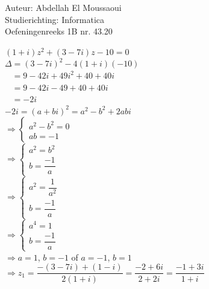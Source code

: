 \documentclass[a4paper]{article}
\begin{document}
  
\noindent \large Auteur: Abdellah El Moussaoui \\
\noindent \large Studierichting: Informatica\\
\noindent \large Oefeningenreeks 1B nr. 43.20\\

\medskip

\normalsize

\medskip

$(1+i)z^2+(3-7i)z-10=0$\\

$\Delta=(3-7i)^2-4(1+i)(-10)$\\

$\phantom{\Delta}=9-42i+49i^2+40+40i$\\

$\phantom{\Delta}=9-42i-49+40+40i$\\

$\phantom{\Delta}=-2i$\\

$-2i = (a+bi)^2 = a^2-b^2+2abi$\\

$\Rightarrow \left \{
\begin{array}{l}
    a^2 - b^2 = 0 \\
    ab = -1
\end{array}
\right .$\\

$\Rightarrow \left \{
\begin{array}{l}
    a^2 = b^2 \\
    b = \dfrac{-1}{a}
\end{array}
\right .$\\

$\Rightarrow \left \{
\begin{array}{l}
    a^2 = \dfrac{1}{a^2} \\
    b = \dfrac{-1}{a}
\end{array}
\right .$\\

$\Rightarrow \left \{
\begin{array}{l}
    a^4 = 1 \\
    b = \dfrac{-1}{a}
\end{array}
\right .$\\

$\Rightarrow a = 1$, $b = -1$ of $a = -1$, $b=1$\\


$\Rightarrow z_1=\dfrac{-(3-7i)+(1-i)}{2(1+i)}=\dfrac{-2+6i}{2+2i}=\dfrac{-1+3i}{1+i}$\\
\end{document}
